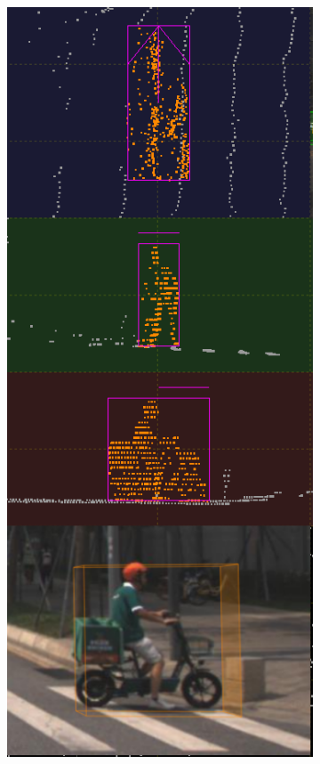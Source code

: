 \documentclass[letterpaper, 10 pt, conference]{ieeeconf}  %
\begin{document}
\begin{figure}[th]
	\begin{subfigure}{0.16\linewidth}
		\includegraphics[scale=0.12]{./figures/transfer/rider-ref}
		\caption{}
	\end{subfigure}
	~
	\begin{subfigure}{0.16\linewidth}

\end{subfigure}
\end{figure}
\end{document}
